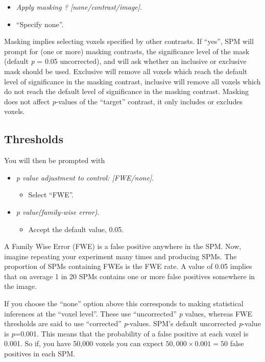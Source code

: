 \begin{itemize}
\item  \emph{Apply masking ? [none/contrast/image]}.
\item ``Specify none''.
\end{itemize}

Masking implies selecting voxels specified by other contrasts. If ``yes'', SPM will prompt for (one or more) masking contrasts, the significance level of the mask (default \textit{p} = 0.05 uncorrected), and will ask whether an inclusive or exclusive mask should be used. Exclusive will remove all voxels which reach the default level of significance in the masking contrast, inclusive will remove all voxels which do not reach the default level of significance in the masking contrast. Masking does not affect \textit{p}-values of the ``target'' contrast, it only includes or excludes voxels.

\subsection{Thresholds}

You will then be prompted with

\begin{itemize}
\item \emph{p value adjustment to control: [FWE/none]}.
\begin{itemize}
\item Select ``FWE''.
\end{itemize}
\item \emph{p value(family-wise error)}.
\begin{itemize}
\item Accept the default value, 0.05.
\end{itemize}
\end{itemize}

A Family Wise Error (FWE) is a false positive anywhere in the SPM. Now, imagine repeating your experiment many times and producing SPMs. The proportion of SPMs containing FWEs is the FWE rate. A value of 0.05 implies that on average 1 in 20 SPMs contains one or more false positives somewhere in the image. 

If you choose the ``none'' option above this corresponds to making statistical inferences at the ``voxel level''. These use ``uncorrected'' \textit{p} values, whereas FWE thresholds are said to use ``corrected'' \textit{p}-values. SPM's default uncorrected \textit{p}-value is \textit{p}=0.001. This means that the probability of a false positive at each voxel is 0.001. So if, you have 50,000 voxels you can expect $50,000 \times 0.001 = 50$ false positives in each SPM.


